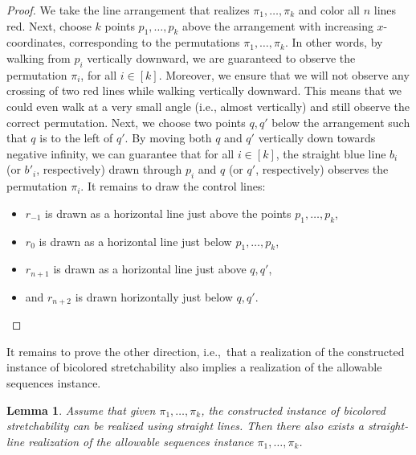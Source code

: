 \documentclass[11pt]{article}
\newtheorem{lemma}[theorem]{Lemma}
\newcommand{\AS}{allowable sequences\xspace}
\begin{document}
\begin{proof}
    We take the line arrangement that realizes $\pi_1, \dots, \pi_k$ and color all $n$ lines red. Next, choose $k$ points $p_1, \dots, p_k$ above the arrangement with increasing $x$-coordinates, corresponding to the permutations $\pi_1, \dots, \pi_k$. In other words, by walking from $p_i$ vertically downward, we are guaranteed to observe the permutation $\pi_i$, for all $i \in [k]$. Moreover, we ensure that we will not observe any crossing of two red lines while walking vertically downward. This means that we could even walk at a very small angle (i.e., almost vertically) and still observe the correct permutation.
%
    Next, we choose two points $q, q'$ below the arrangement such that $q$ is to the left of $q'$. By moving both $q$ and $q'$ vertically down towards negative infinity, we can guarantee that for all $i \in [k]$, the straight blue line $b_i$ (or $b'_i$, respectively) drawn through $p_i$ and $q$ (or $q'$, respectively) observes the permutation $\pi_i$. It remains to draw the control lines:
    \begin{itemize}
        \item $r_{-1}$ is drawn as a horizontal line just above the points $p_1, \dots, p_k$,
        \item $r_0$ is drawn as a horizontal line just below $p_1, \dots, p_k$,
        \item $r_{n + 1}$ is drawn as a horizontal line just above $q, q'$,
        \item and $r_{n + 2}$ is drawn horizontally just below $q, q'$. \qedhere
    \end{itemize}   
\end{proof}
%
It remains to prove the other direction, i.e.,\ that a realization of the constructed instance of bicolored stretchability also implies a realization of the \AS instance.
%
\begin{lemma}
\label{lemma:bic_stretch_3}
    Assume that given $\pi_1, \dots, \pi_k$, the constructed instance of bicolored stretchability can be realized using straight lines. Then there also exists a straight-line realization of the \AS instance $\pi_1, \dots, \pi_k$. 
\end{lemma}
\end{document}
